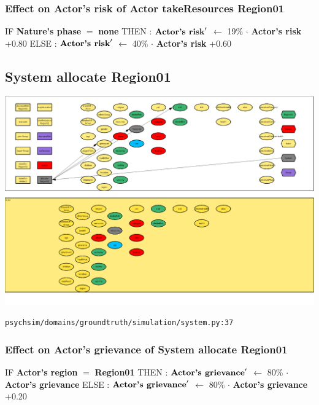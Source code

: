 \documentclass{article}%
\begin{document}
%
\subsubsection{Effect on Actor's risk of Actor takeResources Region01}%
\label{ssubsec:Effect on Actor's risk of Actor takeResources Region01}%
\begin{flushleft}%
IF %
\textbf{Nature's phase}%
$=$%
\textbf{none}%
\linebreak%
\hspace*{2em}%
THEN %
: %
$\mbox{\textbf{Actor's risk}} '$%
$\leftarrow$%
19\%%
$\cdot$%
\textbf{Actor's risk}%
+0.80%
\linebreak%
\hspace*{2em}%
ELSE %
: %
$\mbox{\textbf{Actor's risk}} '$%
$\leftarrow$%
40\%%
$\cdot$%
\textbf{Actor's risk}%
+0.60%
\end{flushleft}

%
\subsection{System allocate Region01}%
\label{subsec:System allocate Region01}%
\includegraphics[width=\textwidth]{images/System-allocate-Region01.png}%
\begin{flushleft}%
\verb|psychsim/domains/groundtruth/simulation/system.py:37|%
\end{flushleft}%
\subsubsection{Effect on Actor's grievance of System allocate Region01}%
\label{ssubsec:Effect on Actor's grievance of System allocate Region01}%
\begin{flushleft}%
IF %
\textbf{Actor's region}%
$=$%
\textbf{Region01}%
\linebreak%
\hspace*{2em}%
THEN %
: %
$\mbox{\textbf{Actor's grievance}} '$%
$\leftarrow$%
80\%%
$\cdot$%
\textbf{Actor's grievance}%
\linebreak%
\hspace*{2em}%
ELSE %
: %
$\mbox{\textbf{Actor's grievance}} '$%
$\leftarrow$%
80\%%
$\cdot$%
\textbf{Actor's grievance}%
+0.20%
\end{flushleft}
\end{document}
